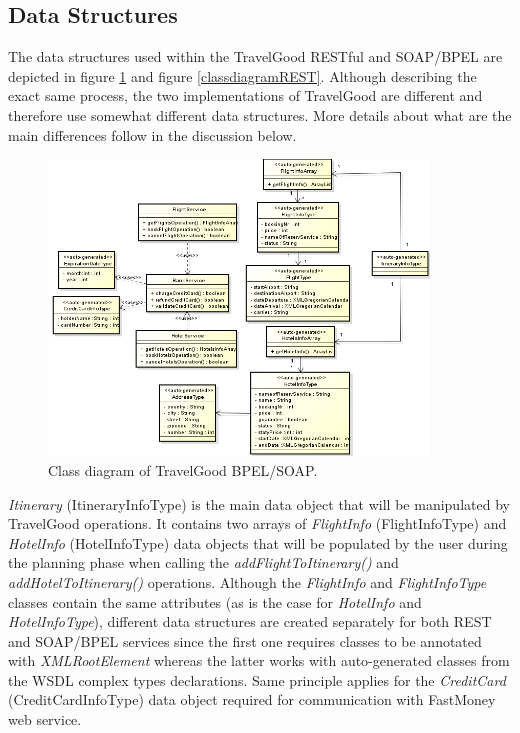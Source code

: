 \subsection{Data Structures}
The data structures used within the TravelGood RESTful and SOAP/BPEL are depicted in figure \ref{classdiagramBPEL} and figure \ref{classdiagramREST}. Although describing the exact same process, the two implementations of TravelGood are different and therefore use somewhat different data structures. More details about what are the main differences follow in the discussion below. 

\begin{figure}[H]
\centering
\includegraphics[width=0.9\textwidth]{images/BPEL-SOAP}
\caption{Class diagram of TravelGood BPEL/SOAP.}
\label{classdiagramBPEL}
\end{figure}

\textit{Itinerary} (ItineraryInfoType) is the main data object that will be manipulated by TravelGood operations. It contains two arrays of \textit{FlightInfo} (FlightInfoType) and \textit{HotelInfo} (HotelInfoType) data objects that will be populated by the user during the planning phase when calling the \textit{addFlightToItinerary()} and \textit{addHotelToItinerary()} operations. Although the \textit{FlightInfo} and \textit{FlightInfoType} classes contain the same attributes (as is the case for \textit{HotelInfo} and \textit{HotelInfoType}), different data structures are created separately for both REST and SOAP/BPEL services since the first one requires classes to be annotated with \textit{\@ XMLRootElement} whereas the latter works with auto-generated classes from the WSDL complex types declarations. Same principle applies for the \textit{CreditCard} (CreditCardInfoType) data object required for communication with FastMoney web service.

